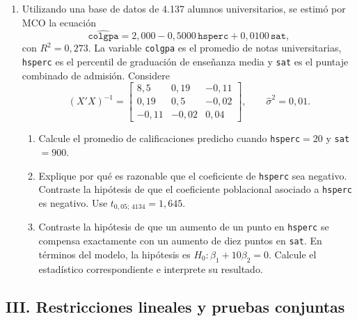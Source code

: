 \documentclass[letterpaper,11pt]{article}
\begin{document}
\begin{enumerate}[resume]
\item Utilizando una base de datos de 4.137 alumnos universitarios, se estimó
    por MCO la ecuación
    \[
        \widehat{\texttt{colgpa}}
        =2{,}000-0{,}5000\,\texttt{hsperc}
        +0{,}0100\,\texttt{sat},
    \]
    con $R^2=0{,}273$. La variable \texttt{colgpa} es el promedio de notas
    universitarias, \texttt{hsperc} es el percentil de graduación de enseñanza
    media y \texttt{sat} es el puntaje combinado de admisión. Considere
    \[
        (X'X)^{-1}=
        \begin{bmatrix}
            8{,}5 & 0{,}19 & -0{,}11\\
            0{,}19 & 0{,}5 & -0{,}02\\
            -0{,}11 & -0{,}02 & 0{,}04
        \end{bmatrix},
        \qquad \widehat{\sigma}^{2}=0{,}01.
    \]
    \begin{enumerate}[label=(\alph*)]
        \item Calcule el promedio de calificaciones predicho cuando
              \texttt{hsperc}$=20$ y \texttt{sat}$=900$.
        \item Explique por qué es razonable que el coeficiente de
              \texttt{hsperc} sea negativo. Contraste la hipótesis de que el
              coeficiente poblacional asociado a \texttt{hsperc} es negativo.
              Use $t_{0{,}05;\,4134}=1{,}645$.
        \item Contraste la hipótesis de que un aumento de un punto en
              \texttt{hsperc} se compensa exactamente con un aumento de diez
              puntos en \texttt{sat}. En términos del modelo, la hipótesis es
              $H_0:\beta_1+10\beta_2=0$. Calcule el estadístico correspondiente
              e interprete su resultado.
    \end{enumerate}

\end{enumerate}

\subsection*{III. Restricciones lineales y pruebas conjuntas}
\end{document}
